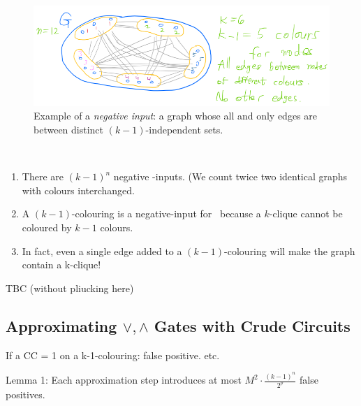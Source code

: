 \begin{description}
\begin{figure}[H]
    \centering
    \includegraphics[width=.6\linewidth]{images/clique2.png}
    \caption{Example of a \emph{negative input}: a graph whose all and only edges are between distinct $(k-1)$-independent sets.}
    \label{fig:enter-label}
\end{figure}

\end{description}

\begin{note}\

\begin{enumerate}
\item There are $(k-1)^n$ negative -inputs. (We count twice two identical graphs with colours interchanged.

\item 
 A $(k-1)$-colouring is a negative-input for \cliquenk\ because a $k$-clique cannot be coloured by $k-1$ colours.
\item
 In fact, even a single edge added to a $(k-1)$-colouring will make the graph contain a k-clique!
\end{enumerate}
\end{note}


TBC (without pliucking here) 


\subsection{Approximating $\lor,\land$ Gates with Crude Circuits }



If a CC = 1 on a k-1-colouring: false positive. etc.


Lemma 1: Each approximation step introduces at most $M^2 \cdot \frac{(k-1)^n}{2^p}$ false positives.

